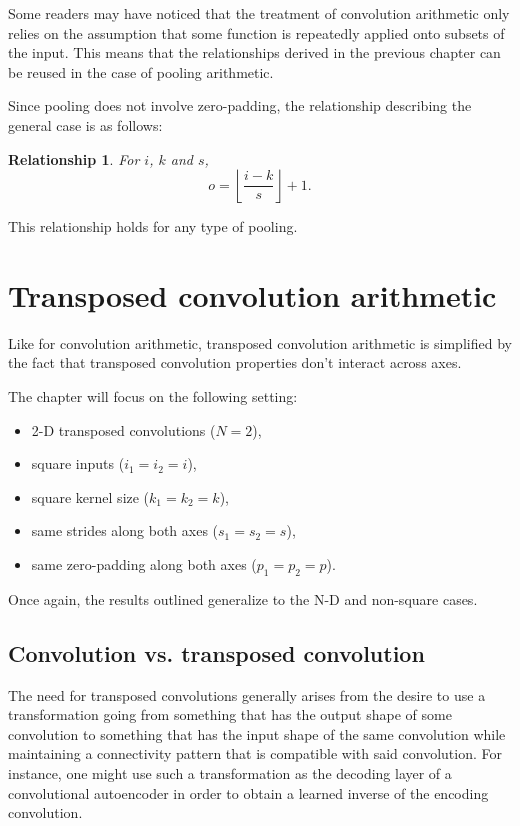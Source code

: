 \documentclass{report}
\newtheorem{relationship}{Relationship}
\begin{document}
Some readers may have noticed that the treatment of convolution arithmetic only
relies on the assumption that some function is repeatedly applied onto subsets
of the input. This means that the relationships derived in the previous chapter
can be reused in the case of pooling arithmetic.

Since pooling does not involve zero-padding, the relationship describing the
general case is as follows:

\begin{relationship}\label{rel:pooling}
For $i$, $k$ and $s$,
\begin{equation*}
    o = \left\lfloor \frac{i - k}{s} \right\rfloor + 1.
\end{equation*}
\end{relationship}

This relationship holds for any type of pooling.

\chapter{Transposed convolution arithmetic}

Like for convolution arithmetic, transposed convolution arithmetic is simplified
by the fact that transposed convolution properties don't interact across axes.

The chapter will focus on the following setting:

\begin{itemize}
    \item 2-D transposed convolutions ($N = 2$),
    \item square inputs ($i_1 = i_2 = i$),
    \item square kernel size ($k_1 = k_2 = k$),
    \item same strides along both axes ($s_1 = s_2 = s$),
    \item same zero-padding along both axes ($p_1 = p_2 = p$).
\end{itemize}

Once again, the results outlined generalize to the N-D and non-square cases.

\section{Convolution vs. transposed convolution}

The need for transposed convolutions generally arises from the desire to use a
transformation going from something that has the output shape of some
convolution to something that has the input shape of the same convolution while
maintaining a connectivity pattern that is compatible with said convolution.
For instance, one might use such a transformation as the decoding layer of a
convolutional autoencoder in order to obtain a learned inverse of the encoding
convolution.
\end{document}
